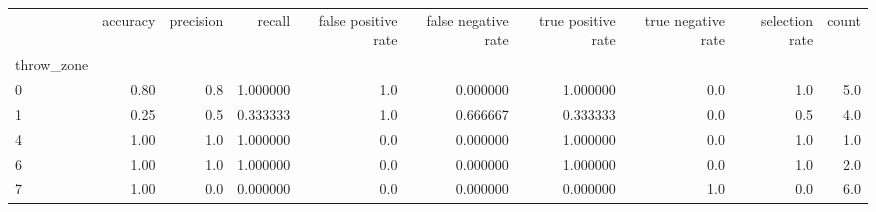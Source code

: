 \begin{tabular}{lrrrrrrrrr}
\toprule
{} &  accuracy &  precision &    recall &  false positive rate &  false negative rate &  true positive rate &  true negative rate &  selection rate &  count \\
throw\_zone &           &            &           &                      &                      &                     &                     &                 &        \\
\midrule
0          &      0.80 &        0.8 &  1.000000 &                  1.0 &             0.000000 &            1.000000 &                 0.0 &             1.0 &    5.0 \\
1          &      0.25 &        0.5 &  0.333333 &                  1.0 &             0.666667 &            0.333333 &                 0.0 &             0.5 &    4.0 \\
4          &      1.00 &        1.0 &  1.000000 &                  0.0 &             0.000000 &            1.000000 &                 0.0 &             1.0 &    1.0 \\
6          &      1.00 &        1.0 &  1.000000 &                  0.0 &             0.000000 &            1.000000 &                 0.0 &             1.0 &    2.0 \\
7          &      1.00 &        0.0 &  0.000000 &                  0.0 &             0.000000 &            0.000000 &                 1.0 &             0.0 &    6.0 \\
\bottomrule
\end{tabular}
